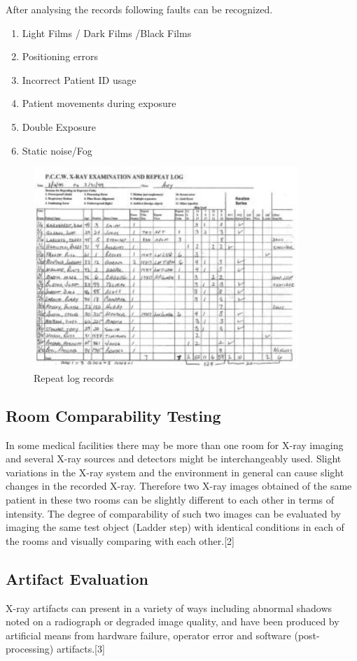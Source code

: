 \documentclass[12pt]{article}
\begin{document}
After analysing the records following faults can be recognized. 

\begin{enumerate}
    \item Light Films / Dark Films /Black Films
    \item Positioning errors
    \item Incorrect Patient ID usage
    \item Patient movements during exposure
    \item Double Exposure
    \item Static noise/Fog
\end{enumerate}


\begin{figure}[h!]
  \centering
  \includegraphics[width=0.5\linewidth]{repeat.jpg}
  \caption{\small{Repeat log records}}
  \label{fig:Repeat log records}
\end{figure}

\subsection{Room Comparability Testing}
In some medical facilities there may be more than one room for X-ray imaging and several X-ray sources and detectors might be interchangeably used. Slight variations in the X-ray system and the environment in general can cause slight changes in the recorded X-ray. Therefore two X-ray images obtained of the same patient in these two rooms can be slightly different to each other in terms of intensity. The degree of comparability of such two images can be evaluated by imaging the same test object (Ladder step) with identical conditions in each of the rooms and visually comparing with each other.[2]

\subsection{Artifact Evaluation}

X-ray artifacts can present in a variety of ways including abnormal shadows noted on a radiograph or degraded image quality, and have been produced by artificial means from hardware failure, operator error and software (post-processing) artifacts.[3]
\end{document}
